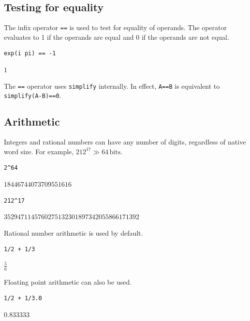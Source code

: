 \documentclass[12pt]{article}
\begin{document}
\subsection{Testing for equality}

The infix operator \verb$==$ is used to test for equality of operands.
The operator evaluates to 1 if the operands are equal and 0 if the operands are not equal.

{\color{blue}
\begin{verbatim}
exp(i pi) == -1
\end{verbatim}
}

$\displaystyle 1$

\bigskip

The \verb$==$ operator uses \verb$simplify$ internally.
In effect, \verb$A==B$ is equivalent to \verb$simplify(A-B)==0$.

\subsection{Arithmetic}

Integers and rational numbers can have any number of digits,
regardless of native word size.
For example, $212^{17}\gg64\,\text{bits}$.

{\color{blue}
\begin{verbatim}
2^64
\end{verbatim}
}

$\displaystyle 18446744073709551616$

{\color{blue}
\begin{verbatim}
212^17
\end{verbatim}
}

$\displaystyle 3529471145760275132301897342055866171392$

\bigskip

Rational number arithmetic is used by default.

{\color{blue}
\begin{verbatim}
1/2 + 1/3
\end{verbatim}
}

$\displaystyle \tfrac{5}{6}$

\bigskip

Floating point arithmetic can also be used.

{\color{blue}
\begin{verbatim}
1/2 + 1/3.0
\end{verbatim}
}

$\displaystyle 0.833333$

\bigskip
\end{document}
